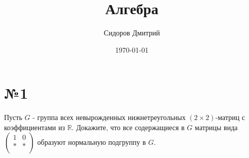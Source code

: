 \documentclass[a4paper, 16pt]{article}
\title{Алгебра}
\date{\today}
\author{Сидоров Дмитрий}
\affil{Группа БПМИ 219}
\newcommand{\R} {\mathbb{R}}
\begin{document}
	\maketitle
	
	\section*{№1}
	
	Пусть $G$ - группа всех невырожденных нижнетреугольных $(2 \times 2)$-матриц с коэффициентами из $\R$. Докажите, что все содержащиеся в $G$ матрицы вида
	$ \begin{pmatrix}
		1 & 0 \\
		* & * \\
	\end{pmatrix}$ образуют нормальную подгруппу в $G$.
\end{document}
